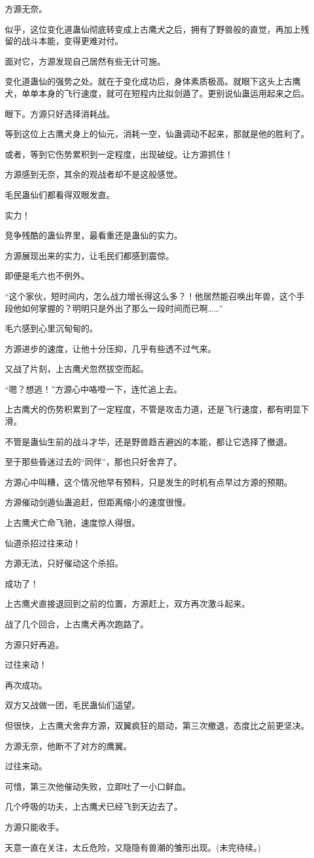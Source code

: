 \begin{this_body}
方源无奈。

似乎，这位变化道蛊仙彻底转变成上古鹰犬之后，拥有了野兽般的直觉，再加上残留的战斗本能，变得更难对付。

面对它，方源发现自己居然有些无计可施。

变化道蛊仙的强势之处。就在于变化成功后，身体素质极高。就眼下这头上古鹰犬，单单本身的飞行速度，就可在短程内比拟剑遁了。更别说仙蛊运用起来之后。

眼下。方源只好选择消耗战。

等到这位上古鹰犬身上的仙元，消耗一空，仙蛊调动不起来，那就是他的胜利了。

或者，等到它伤势累积到一定程度，出现破绽。让方源抓住！

方源感到无奈，其余的观战者却不是这般感觉。

毛民蛊仙们都看得双眼发直。

实力！

竞争残酷的蛊仙界里，最看重还是蛊仙的实力。

方源展现出来的实力，让毛民们都感到震惊。

即便是毛六也不例外。

“这个家伙，短时间内，怎么战力增长得这么多？！他居然能召唤出年兽，这个手段他如何掌握的？明明只是外出了那么一段时间而已啊……”

毛六感到心里沉甸甸的。

方源进步的速度，让他十分压抑，几乎有些透不过气来。

又战了片刻，上古鹰犬忽然拔空而起。

“嗯？想逃！”方源心中咯噔一下，连忙追上去。

上古鹰犬的伤势积累到了一定程度，不管是攻击力道，还是飞行速度，都有明显下滑。

不管是蛊仙生前的战斗才华，还是野兽趋吉避凶的本能，都让它选择了撤退。

至于那些昏迷过去的“同伴”，那也只好舍弃了。

方源心中叫糟，这个情况他早有预料，只是发生的时机有点早过方源的预期。

方源催动剑遁仙蛊追赶，但距离缩小的速度很慢。

上古鹰犬亡命飞驰，速度惊人得很。

仙道杀招过往来动！

方源无法，只好催动这个杀招。

成功了！

上古鹰犬直接退回到之前的位置，方源赶上，双方再次激斗起来。

战了几个回合，上古鹰犬再次跑路了。

方源只好再追。

过往来动！

再次成功。

双方又战做一团，毛民蛊仙们遥望。

但很快，上古鹰犬舍弃方源，双翼疯狂的扇动，第三次撤退，态度比之前更坚决。

方源无奈，他断不了对方的鹰翼。

过往来动。

可惜，第三次他催动失败，立即吐了一小口鲜血。

几个呼吸的功夫，上古鹰犬已经飞到天边去了。

方源只能收手。

天意一直在关注，太丘危险，又隐隐有兽潮的雏形出现。(未完待续。)

\end{this_body}

